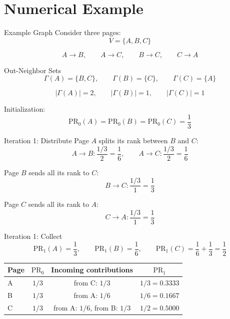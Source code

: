 \documentclass[aspectratio=169,11pt]{beamer}
\newcommand{\PR}{\mathrm{PR}}
\begin{document}
\section{Numerical Example}

\begin{frame}{Example Graph}
Consider three pages:
\[
V=\{A,B,C\}
\]

\[
A \rightarrow B,\qquad A \rightarrow C,\qquad B \rightarrow C,\qquad C \rightarrow A
\]

\centering
{}
\end{frame}

\begin{frame}{Out-Neighbor Sets}
\[
\Gamma(A)=\{B,C\}, \qquad \Gamma(B)=\{C\}, \qquad \Gamma(C)=\{A\}
\]

\[
|\Gamma(A)|=2,\qquad |\Gamma(B)|=1,\qquad |\Gamma(C)|=1
\]

\vspace{0.5em}
Initialization:
\[
\PR_0(A)=\PR_0(B)=\PR_0(C)=\frac{1}{3}
\]
\end{frame}

\begin{frame}{Iteration 1: Distribute}
Page \(A\) splits its rank between \(B\) and \(C\):
\[
A \rightarrow B: \frac{1/3}{2}=\frac{1}{6},
\qquad
A \rightarrow C: \frac{1/3}{2}=\frac{1}{6}
\]

Page \(B\) sends all its rank to \(C\):
\[
B \rightarrow C: \frac{1/3}{1}=\frac{1}{3}
\]

Page \(C\) sends all its rank to \(A\):
\[
C \rightarrow A: \frac{1/3}{1}=\frac{1}{3}
\]
\end{frame}

\begin{frame}{Iteration 1: Collect}
\[
\PR_1(A)=\frac{1}{3},
\qquad
\PR_1(B)=\frac{1}{6},
\qquad
\PR_1(C)=\frac{1}{6}+\frac{1}{3}=\frac{1}{2}
\]

\begin{center}
\small
\begin{tabular}{lccc}
\toprule
Page & \(\PR_0\) & Incoming contributions & \(\PR_1\) \\
\midrule
A & \(1/3\) & from C: \(1/3\) & \(1/3 = 0.3333\) \\
B & \(1/3\) & from A: \(1/6\) & \(1/6 = 0.1667\) \\
C & \(1/3\) & from A: \(1/6\), from B: \(1/3\) & \(1/2 = 0.5000\) \\
\bottomrule
\end{tabular}
\end{center}
\end{frame}
\end{document}
